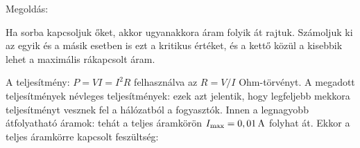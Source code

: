 
\ifdefined\megoldas

 Megoldás: 

 Ha sorba kapcsoljuk őket, akkor ugyanakkora áram folyik át rajtuk. Számoljuk ki az egyik és a másik esetben is ezt a kritikus értéket, és a kettő közül a kisebbik lehet a maximális rákapcsolt áram. 

 A teljesítmény: $P=VI=I^2 R$ felhasználva az $R=V/I$ Ohm-törvényt. A megadott teljesítmények névleges teljesítmények: ezek azt jelentik, hogy legfeljebb mekkora teljesítményt vesznek fel a hálózatból a fogyasztók. Innen a legnagyobb átfolyatható áramok:
 tehát a teljes áramkörön $I_\text{max}=0,01\mathrm{\, A}$ folyhat át. Ekkor a teljes áramkörre kapcsolt feszültség:
 
\fi